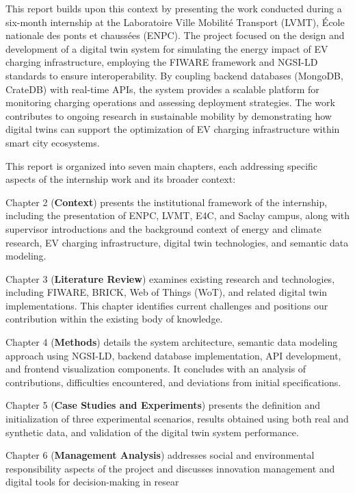 This report builds upon this context by presenting the work conducted during 
a six-month internship at the Laboratoire Ville Mobilité Transport (LVMT), 
École nationale des ponts et chaussées (ENPC). The project focused on the 
design and development of a digital twin system for simulating the energy 
impact of EV charging infrastructure, employing the FIWARE framework and 
NGSI-LD standards to ensure interoperability. By coupling backend databases 
(MongoDB, CrateDB) with real-time APIs, the system provides a scalable 
platform for monitoring charging operations and assessing deployment 
strategies. The work contributes to ongoing research in sustainable mobility 
by demonstrating how digital twins can support the optimization of EV 
charging infrastructure within smart city ecosystems.

This report is organized into seven main chapters, each addressing specific aspects 
of the internship work and its broader context:

Chapter 2 (\textbf{Context}) presents the institutional framework of the internship, 
including the presentation of ENPC, LVMT, E4C, and Saclay campus, along with supervisor 
introductions and the background context of energy and climate research, EV charging 
infrastructure, digital twin technologies, and semantic data modeling.

Chapter 3 (\textbf{Literature Review}) examines existing research and technologies, 
including FIWARE, BRICK, Web of Things (WoT), and related digital twin implementations. 
This chapter identifies current challenges and positions our contribution within the 
existing body of knowledge.

Chapter 4 (\textbf{Methods}) details the system architecture, semantic data modeling 
approach using NGSI-LD, backend database implementation, API development, and frontend 
visualization components. It concludes with an analysis of contributions, difficulties 
encountered, and deviations from initial specifications.

Chapter 5 (\textbf{Case Studies and Experiments}) presents the definition and 
initialization of three experimental scenarios, results obtained using both real 
and synthetic data, and validation of the digital twin system performance.

Chapter 6 (\textbf{Management Analysis}) addresses social and environmental 
responsibility aspects of the project and discusses innovation management and digital 
tools for decision-making in resear


